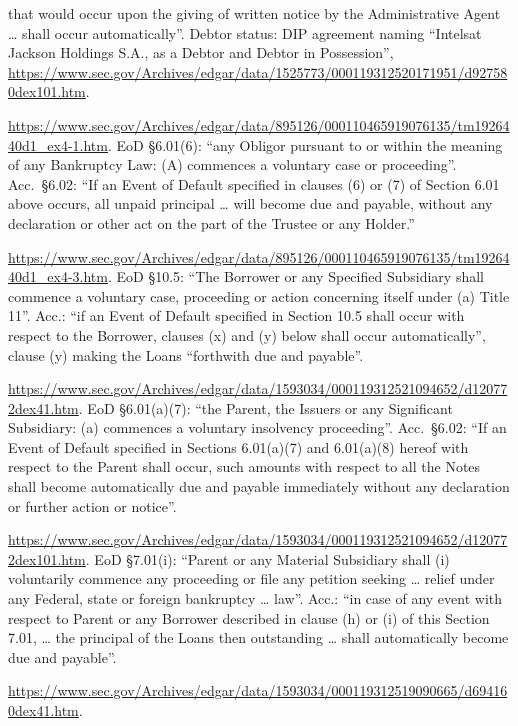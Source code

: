 \documentclass[11pt]{article}
\begin{document}
{\begin{description}[leftmargin=0pt,itemsep=3pt]
that would occur upon the giving of written notice by the Administrative Agent \ldots{} shall occur
automatically''. Debtor status: DIP agreement naming ``Intelsat Jackson Holdings S.A., as a Debtor and Debtor
in Possession'', \url{https://www.sec.gov/Archives/edgar/data/1525773/000119312520171951/d927580dex101.htm}.
\item[Chesapeake 11.5\% second-lien notes due 2025.] \url{https://www.sec.gov/Archives/edgar/data/895126/000110465919076135/tm1926440d1_ex4-1.htm}.
EoD \S6.01(6): ``any Obligor pursuant to or within the meaning of any Bankruptcy Law: (A) commences a voluntary
case or proceeding''. Acc.\ \S6.02: ``If an Event of Default specified in clauses (6) or (7) of Section 6.01
above occurs, all unpaid principal \ldots{} will become due and payable, without any declaration or other act
on the part of the Trustee or any Holder.''
\item[Chesapeake FLLO term loan.] \url{https://www.sec.gov/Archives/edgar/data/895126/000110465919076135/tm1926440d1_ex4-3.htm}.
EoD \S10.5: ``The Borrower or any Specified Subsidiary shall commence a voluntary case, proceeding or action
concerning itself under (a) Title 11''. Acc.: ``if an Event of Default specified in Section 10.5 shall occur
with respect to the Borrower, clauses (x) and (y) below shall occur automatically'', clause (y) making the
Loans ``forthwith due and payable''.
\item[Endo 6.125\% notes due 2029.] \url{https://www.sec.gov/Archives/edgar/data/1593034/000119312521094652/d120772dex41.htm}.
EoD \S6.01(a)(7): ``the Parent, the Issuers or any Significant Subsidiary: (a) commences a voluntary insolvency
proceeding''. Acc.\ \S6.02: ``If an Event of Default specified in Sections 6.01(a)(7) and 6.01(a)(8) hereof
with respect to the Parent shall occur, such amounts with respect to all the Notes shall become automatically
due and payable immediately without any declaration or further action or notice''.
\item[Endo 2021 term loans.] \url{https://www.sec.gov/Archives/edgar/data/1593034/000119312521094652/d120772dex101.htm}.
EoD \S7.01(i): ``Parent or any Material Subsidiary shall (i) voluntarily commence any proceeding or file any
petition seeking \ldots{} relief under any Federal, state or foreign bankruptcy \ldots{} law''. Acc.: ``in case of
any event with respect to Parent or any Borrower described in clause (h) or (i) of this Section 7.01, \ldots{}
the principal of the Loans then outstanding \ldots{} shall automatically become due and payable''.
\item[Par Pharmaceutical 7.500\% notes due 2027.] \url{https://www.sec.gov/Archives/edgar/data/1593034/000119312519090665/d694160dex41.htm}.

\end{description}}
\end{document}
